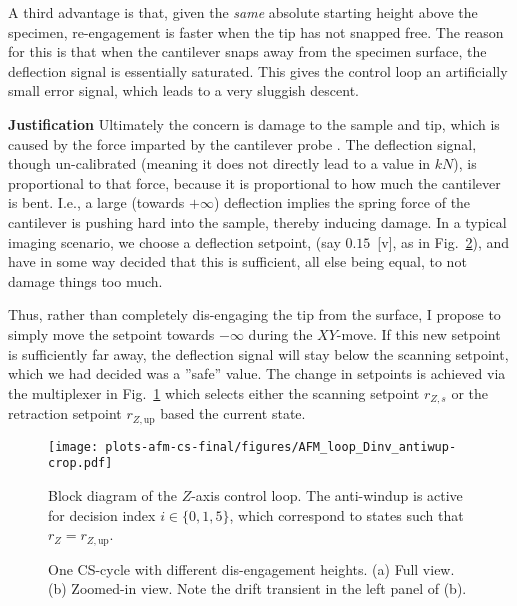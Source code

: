 A third advantage is that, given the \emph{same} absolute starting height above the specimen, re-engagement is faster when the tip has not snapped free. The reason for this is that when the cantilever snaps away from the specimen surface, the deflection signal is essentially saturated. This gives the control loop an artificially small error signal, which leads to a very sluggish descent.


\textbf{Justification} Ultimately the concern is damage to the sample and tip, which is caused by the force imparted by the cantilever probe \cite{clayton_review_2009}. The deflection signal, though un-calibrated (meaning it does not directly lead to a value in $kN$), is proportional to that force, because it is proportional to how much the cantilever is bent. I.e., a large (towards $+\infty$) deflection implies the spring force of the cantilever is pushing hard into the sample, thereby inducing damage. In a typical imaging scenario, we choose a deflection setpoint, (say $0.15$~[v], as in Fig.~\ref{fig:z_drift}), and have in some way decided that this is sufficient, all else being equal, to not damage things too much.

Thus, rather than completely dis-engaging the tip from the surface, I propose to simply move the setpoint towards $-\infty$ during the $XY$-move. If this new setpoint is sufficiently far away, the deflection signal will stay below the scanning setpoint, which we had decided was a ''safe'' value. The change in setpoints is achieved via the multiplexer in Fig.~\ref{fig:afm_bd_dinv_final} which selects either the scanning setpoint $r_{Z,s}$ or the retraction setpoint $r_{Z,\textrm{up}}$ based the current state.
\begin{figure}[t]
  \centering
  \texttt{[image: plots-afm-cs-final/figures/AFM\_loop\_Dinv\_antiwup-crop.pdf]}
  \caption{Block diagram of the $Z$-axis control loop. The anti-windup is active for decision index $i\in\{0,1,5\}$, which correspond to states such that $r_Z=r_{Z,\textrm{up}}$.}
  \label{fig:afm_bd_dinv_final}
\end{figure}

\begin{figure}[ht!]
  \begin{subfigure}{.48\textwidth}
    
    \caption{ }
  \end{subfigure}
  \begin{subfigure}{.48\textwidth}
    
    \caption{ }
  \end{subfigure}
  \caption{One CS-cycle with different dis-engagement heights. (a) Full view. (b) Zoomed-in view. Note the  drift transient in the left panel of (b). }
  \label{fig:z_drift}
\end{figure}

